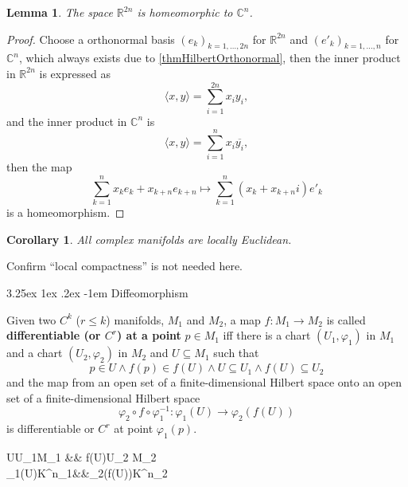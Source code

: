 \documentclass[12pt, letterpaper]{article}
\makeatletter
\newcommand{\re}{\mathbb{R}}
\newcommand{\co}{\mathbb{C}}
\newcommand{\red}[1]{{\color{red} #1}}
\newcommand{\conj}{\overline}
\newenvironment{centikzcd}{\center\tikzcd}{\endtikzcd\endcenter}
\newtheorem{lem}[prop]{Lemma}
\newtheorem{cor}[prop]{Corollary}
\renewcommand\paragraph{\@startsection{paragraph}{4}{\z@}%
	{3.25ex \@plus1ex \@minus.2ex}%
	{-1em}%
	{\normalfont\normalsize\bfseries}}
\theoremstyle{definition}
\theoremstyle{remark}
\theoremstyle{definition}
\theoremstyle{plain}
\numberwithin{equation}{section}
\makeatother
\begin{document}
	\begin{lem}
		The space $\re^{2n}$ is homeomorphic to $\co^{n}$.
	\end{lem}
	\begin{proof}
		Choose a orthonormal basis $(e_k)_{k=1,\dots,2n}$ for $\re^{2n}$
		and $(e'_k)_{k=1,\dots,n}$ for $\co^n$,
		which always exists due to \autoref{thmHilbertOrthonormal},
		then the inner product in $\re^{2n}$ is expressed as
		\[ \langle x,y\rangle = \sum_{i=1}^{2n} x_iy_i, \]
		and the inner product in $\co^{n}$ is
		\[ \langle x,y\rangle = \sum_{i=1}^{n} x_i \conj{y_i}, \]
		then the map
		\[ \sum_{k=1}^n x_{k} e_k + x_{k+n} e_{k+n} \mapsto \sum_{k=1}^n (x_{k}+x_{k+n}i) e'_{k} \]
		is a homeomorphism.
	\end{proof}

	\begin{cor}
		All complex manifolds are locally Euclidean.
	\end{cor}

	\red{Confirm ``local compactness'' is not needed here.}
		
	\paragraph{Diffeomorphism}
	\begin{def*}
		Given two $C^k$ ($r\le k$) manifolds, $M_1$ and $M_2$,
		a map $f\colon M_1\to M_2$
		is called \textbf{differentiable (or $C^r$) at a point} $p\in M_1$
		iff there is a chart $(U_1,\varphi_1)$ in $M_1$ and a chart $(U_2,\varphi_2)$ in $M_2$
		and $U\subseteq M_1$ such that
		\[ p\in U \land f(p)\in f(U)  \land U \subseteq U_1 \land f(U)\subseteq U_2 \]
		and the map from an open set of a finite-dimensional Hilbert space
		onto an open set of a finite-dimensional Hilbert space
		\[ \varphi_2 \circ f\circ \varphi_1^{-1} \colon \varphi_1(U)\to\varphi_2(f(U)) \]
		is differentiable or $C^r$ at point $\varphi_1(p)$.
	\end{def*}

	\begin{centikzcd}
		U\subseteq U_1\subseteq M_1 \ar[rr,"f"]\ar[from=d,"\varphi_1^{-1}"] && f(U)\subseteq U_2 \subseteq M_2\ar[d,"\varphi_2"]\\
		\varphi_1(U)\subseteq K^{n_1} &&\varphi_2(f(U))\subseteq K^{n_2}\\
	\end{centikzcd}
	
\end{document}
